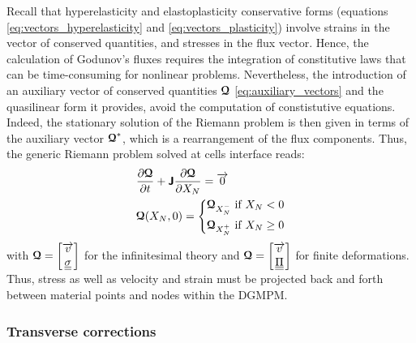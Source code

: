 Recall that hyperelasticity and elastoplasticity conservative forms (equations \eqref{eq:vectors_hyperelasticity} and \eqref{eq:vectors_plasticity}) involve strains in the vector of conserved quantities, and stresses in the flux vector.
Hence, the calculation of Godunov's fluxes requires the integration of constitutive laws that can be time-consuming for nonlinear problems. Nevertheless, the introduction of an auxiliary vector of conserved quantities ${\boldsymbol{\mathcal{Q}}}$ \eqref{eq:auxiliary_vectors} and the quasilinear form it provides, avoid the computation of constistutive equations. Indeed, the stationary solution of the Riemann problem is then given in terms of the auxiliary vector ${\boldsymbol{\mathcal{Q}}}^*$, which is a rearrangement of the flux components. Thus, the generic Riemann problem solved at cells interface reads:
\begin{equation}
  \label{eq:RP_quasilinear}
  \begin{aligned}
    &\frac{\partial {\boldsymbol{\mathcal{Q}}}}{\partial t} + \boldsymbol{\mathsf{J}} \frac{\partial {\boldsymbol{\mathcal{Q}}}}{\partial X_N} = {\overrightarrow{0}}  \\
    & {\boldsymbol{\mathcal{Q}}}(X_N,0)= \left\lbrace 
      \begin{aligned}
        & {\boldsymbol{\mathcal{Q}}}_{X_N^-} \text{ if } X_N <0 \\
        & {\boldsymbol{\mathcal{Q}}}_{X_N^{+}} \text{ if } X_N \geq 0
      \end{aligned}
        \right.
  \end{aligned}
\end{equation}
with ${\boldsymbol{\mathcal{Q}}}=\left[\begin{matrix}{\overrightarrow{v}} \\ {\underline{\underline{\sigma}}}\end{matrix}\right]$ for the infinitesimal theory and ${\boldsymbol{\mathcal{Q}}} = \left[\begin{matrix}{\overrightarrow{v}} \\ {\underline{\underline{\Pi}}}\end{matrix}\right]$ for finite deformations. Thus, stress as well as velocity and strain must be projected back and forth between material points and nodes within the DGMPM.

\subsubsection*{Transverse corrections}

